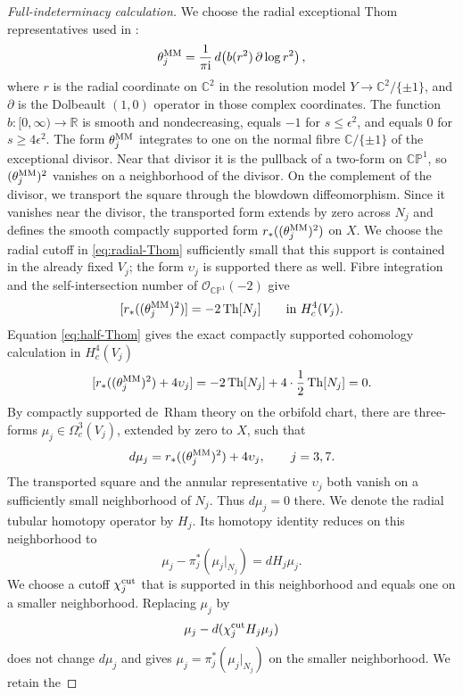 \documentclass[11pt]{article}
\theoremstyle{remark}\newtheorem{remark}[theorem]{Remark}
\newcommand{\ii}{\mathrm i}
\newcommand{\R}{\mathbb R}
\newcommand{\C}{\mathbb C}
\newcommand{\CP}{\mathbb {CP}}
\begin{document}
\begin{proof}[Full-indeterminacy calculation]
We choose the radial exceptional Thom representatives used in \cite{MM}:
\begin{equation}\label{eq:radial-Thom}
 \theta_j^{\rm MM}
 =\frac1{\pi\ii}\,d\!\left(b(r^2)\,\partial\log r^2\right),
\end{equation}
where $r$ is the radial coordinate on $\C^2$ in the resolution model
$Y\to\C^2/\{\pm1\}$, and $\partial$ is the Dolbeault $(1,0)$ operator in
those complex coordinates.  The function $b:[0,\infty)\to\R$ is smooth
and nondecreasing, equals $-1$ for
$s\leq\epsilon^2$, and equals $0$ for $s\geq4\epsilon^2$.  The form
$\theta_j^{\rm MM}$ integrates to one on the normal fibre
$\C/\{\pm1\}$ of the exceptional divisor.  Near that divisor it is the
pullback of a two-form on $\CP^1$, so
$(\theta_j^{\rm MM})^2$ vanishes on a neighborhood of the divisor.  On the
complement of the divisor, we transport the square through the blowdown
diffeomorphism.  Since it vanishes near the divisor, the transported form
extends by zero across $N_j$ and defines the smooth compactly supported
form $r_*((\theta_j^{\rm MM})^2)$ on $X$.  We choose the radial cutoff in
\eqref{eq:radial-Thom} sufficiently small that this support is contained in
the already fixed $V_j$; the form $\upsilon_j$ is supported there as well.
Fibre integration and the self-intersection number of
$\mathcal O_{\CP^1}(-2)$ give
\begin{equation}\label{eq:radial-Thom-square}
 [r_*((\theta_j^{\rm MM})^2)]
 =-2\operatorname{Th}[N_j]\qquad\text{in }H_c^4(V_j).
\end{equation}
Equation \eqref{eq:half-Thom} gives the exact compactly supported
cohomology calculation in $H_c^4(V_j)$
\[
 [r_*((\theta_j^{\rm MM})^2)+4\upsilon_j]
 =-2\operatorname{Th}[N_j]+4\cdot\frac12\operatorname{Th}[N_j]=0.
\]
By compactly supported de~Rham theory on the orbifold chart, there are
three-forms $\mu_j\in\Omega_c^3(V_j)$, extended by zero to $X$, such that
\[
 d\mu_j=r_*((\theta_j^{\rm MM})^2)+4\upsilon_j,
 \qquad j=3,7.
\]
The transported square and the annular representative $\upsilon_j$ both
vanish on a sufficiently small neighborhood of $N_j$.  Thus $d\mu_j=0$
there.  We denote the radial tubular homotopy operator by $H_j$.  Its
homotopy identity reduces on this neighborhood to
\[
 \mu_j-\pi_j^*(\mu_j|_{N_j})=dH_j\mu_j.
\]
We choose a cutoff $\chi_j^{\rm cut}$ that is supported in this
neighborhood and equals one on a smaller neighborhood.  Replacing $\mu_j$
by
\[
 \mu_j-d(\chi_j^{\rm cut}H_j\mu_j)
\]
does not change $d\mu_j$ and gives
$\mu_j=\pi_j^*(\mu_j|_{N_j})$ on the smaller neighborhood.  We retain the

\end{proof}
\end{document}
